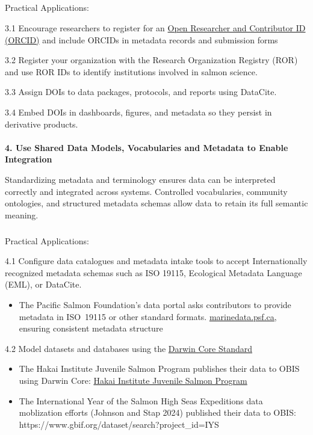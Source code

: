\documentclass[
  letterpaper,
  DIV=11,
  numbers=noendperiod]{scrartcl}
\makeatletter
\let\oldparagraph\paragraph
\renewcommand{\paragraph}{
    \@ifstar
      \xxxParagraphStar
      \xxxParagraphNoStar
  }
\newcommand{\xxxParagraphStar}[1]{\oldparagraph*{#1}\mbox{}}
\newcommand{\xxxParagraphNoStar}[1]{\oldparagraph{#1}\mbox{}}
\let\oldsubparagraph\subparagraph
\renewcommand{\subparagraph}{
    \@ifstar
      \xxxSubParagraphStar
      \xxxSubParagraphNoStar
  }
\newcommand{\xxxSubParagraphStar}[1]{\oldsubparagraph*{#1}\mbox{}}
\newcommand{\xxxSubParagraphNoStar}[1]{\oldsubparagraph{#1}\mbox{}}
\providecommand{\tightlist}{%
  \setlength{\itemsep}{0pt}\setlength{\parskip}{0pt}}\usepackage{longtable,booktabs,array}
\makeatother
\begin{document}
\subparagraph{Practical Applications:}\label{practical-applications-2}

3.1 Encourage researchers to register for an
\href{https://orcid.org/}{Open Researcher and Contributor ID (ORCID)}
and include ORCIDs in metadata records and submission forms

3.2 Register your organization with the Research Organization Registry
(ROR) and use ROR IDs to identify institutions involved in salmon
science.

3.3 Assign DOIs to data packages, protocols, and reports using DataCite.

3.4 Embed DOIs in dashboards, figures, and metadata so they persist in
derivative products.

\paragraph{\texorpdfstring{\textbf{4. Use Shared Data Models,
Vocabularies and Metadata to Enable
Integration}}{4. Use Shared Data Models, Vocabularies and Metadata to Enable Integration}}\label{use-shared-data-models-vocabularies-and-metadata-to-enable-integration}

Standardizing metadata and terminology ensures data can be interpreted
correctly and integrated across systems. Controlled vocabularies,
community ontologies, and structured metadata schemas allow data to
retain its full semantic meaning.

\subparagraph{Practical Applications:}\label{practical-applications-3}

4.1 Configure data catalogues and metadata intake tools to accept
Internationally recognized metadata schemas such as ISO 19115,
Ecological Metadata Language (EML), or DataCite.

\begin{itemize}
\tightlist
\item
  The Pacific Salmon Foundation's data portal asks contributors to
  provide metadata in ISO~19115 or other standard formats.
  \href{https://marinedata.psf.ca/data/data-submission-form/\#:~:text=}{\ul{marinedata.psf.ca}},
  ensuring consistent metadata structure
\end{itemize}

4.2 Model datasets and databases using the
\href{https://dwc.tdwg.org/}{Darwin Core Standard}

\begin{itemize}
\item
  The Hakai Institute Juvenile Salmon Program publishes their data to
  OBIS using Darwin Core:
  \href{https://www.gbif.org/dataset/72de3af4-1572-4f2d-8006-2bfa2007065c}{Hakai
  Institute Juvenile Salmon Program}
\item
  The International Year of the Salmon High Seas Expeditions data
  moblization efforts (Johnson and Stap 2024) published their data to
  OBIS: https://www.gbif.org/dataset/search?project\_id=IYS
\end{itemize}
\end{document}
